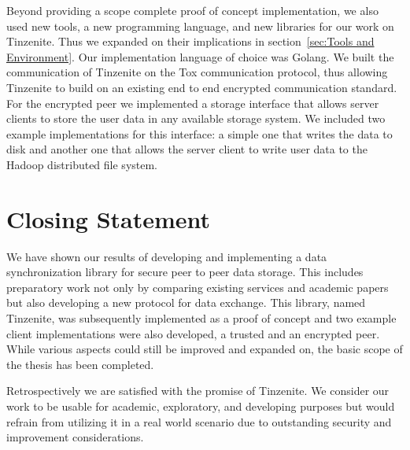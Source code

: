 Beyond providing a scope complete proof of concept implementation, we also used new tools, a new programming language, and new libraries for our work on Tinzenite.
Thus we expanded on their implications in section~\ref{sec:Tools and Environment}.
Our implementation language of choice was Golang.
We built the communication of Tinzenite on the Tox communication protocol, thus allowing Tinzenite to build on an existing end to end encrypted communication standard.
For the encrypted peer we implemented a storage interface that allows server clients to store the user data in any available storage system.
We included two example implementations for this interface: a simple one that writes the data to disk and another one that allows the server client to write user data to the Hadoop distributed file system.

\section{Closing Statement}
\label{sec:Closing Statement}

We have shown our results of developing and implementing a data synchronization library for secure peer to peer data storage.
This includes preparatory work not only by comparing existing services and academic papers but also developing a new protocol for data exchange.
This library, named Tinzenite, was subsequently implemented as a proof of concept and two example client implementations were also developed, a trusted and an encrypted peer.
While various aspects could still be improved and expanded on, the basic scope of the thesis has been completed.

Retrospectively we are satisfied with the promise of Tinzenite.
We consider our work to be usable for academic, exploratory, and developing purposes but would refrain from utilizing it in a real world scenario due to outstanding security and improvement considerations.
